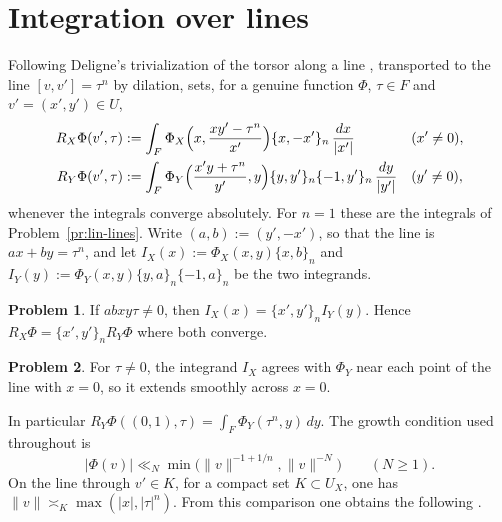 \documentclass[reqno]{amsart}
\numberwithin{equation}{section}
\theoremstyle{definition}
\newtheorem{problem}{Problem}[section]
\theoremstyle{plain}
\begin{document}
\section{Integration over lines}\label{sec:lines}

Following Deligne's trivialization of the torsor along a line \cite[\S\S1.13--1.14, 6.3]{Del}, transported to the line $[v, v'] = \tau^n$ by dilation, \cite[Definition~4.1]{N} sets, for a genuine function $\Phi$, $\tau \in F$ and $v' = (x', y') \in U$,
\begin{align*}
  R_X \Phi(v', \tau)
  &:= \int_F \Phi_X \Bigl( x, \frac{x y' - \tau^n}{x'} \Bigr) \{x, -x'\}_n \, \frac{d x}{\lvert x' \rvert}
  && (x' \neq 0), \\
  R_Y \Phi(v', \tau)
  &:= \int_F \Phi_Y \Bigl( \frac{x' y + \tau^n}{y'}, y \Bigr) \{y, y'\}_n \{-1, y'\}_n \, \frac{d y}{\lvert y' \rvert}
  && (y' \neq 0),
\end{align*}
whenever the integrals converge absolutely.  For $n = 1$ these are the integrals of Problem~\ref{pr:lin-lines}.  Write $(a, b) := (y', -x')$, so that the line is $a x + b y = \tau^n$, and let $I_X(x) := \Phi_X(x, y) \{x, b\}_n$ and $I_Y(y) := \Phi_Y(x, y) \{y, a\}_n \{-1, a\}_n$ be the two integrands.

\begin{problem}\label{pr:lines-steinberg}
  If $a b x y \tau \neq 0$, then $I_X(x) = \{x', y'\}_n I_Y(y)$.  Hence $R_X \Phi = \{x', y'\}_n R_Y \Phi$ where both converge.
\end{problem}

\begin{problem}\label{pr:lines-continuity}
  For $\tau \neq 0$, the integrand $I_X$ agrees with $\Phi_Y$ near each point of the line with $x = 0$, so it extends smoothly across $x = 0$.
\end{problem}

In particular $R_Y \Phi((0, 1), \tau) = \int_F \Phi_Y(\tau^n, y) \, d y$.  The growth condition used throughout is
\begin{equation}\label{eq:growth}
  \lvert \Phi(v) \rvert \ll_N \min \bigl( \lVert v \rVert^{-1 + 1/n}, \lVert v \rVert^{-N} \bigr) \qquad (N \geq 1).
\end{equation}
On the line through $v' \in K$, for a compact set $K \subset U_X$, one has $\lVert v \rVert \asymp_K \max(\lvert x \rvert, \lvert \tau \rvert^n)$.  From this comparison one obtains the following \cite[Lemma~4.2]{N}.
\end{document}
